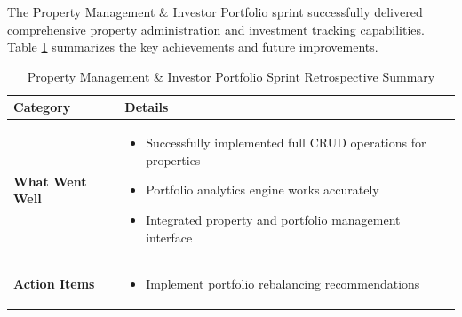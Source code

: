 The Property Management \& Investor Portfolio sprint successfully delivered comprehensive property administration and investment tracking capabilities. Table \ref{tab:property-portfolio-retrospective} summarizes the key achievements and future improvements.

\begin{table}[htbp]
    \centering
    \begin{tabular}{|p{3cm}|p{10cm}|}
        \hline
        \textbf{Category} & \textbf{Details} \\
        \hline
        \textbf{What Went Well} & 
        \begin{itemize}
            \item Successfully implemented full CRUD operations for properties
            \item Portfolio analytics engine works accurately
            \item Integrated property and portfolio management interface
        \end{itemize} \\
        \hline
        \textbf{Action Items} & 
        \begin{itemize}
            \item Implement portfolio rebalancing recommendations
        \end{itemize} \\
        \hline
    \end{tabular}
    \caption{Property Management \& Investor Portfolio Sprint Retrospective Summary}
    \label{tab:property-portfolio-retrospective}
\end{table}

 